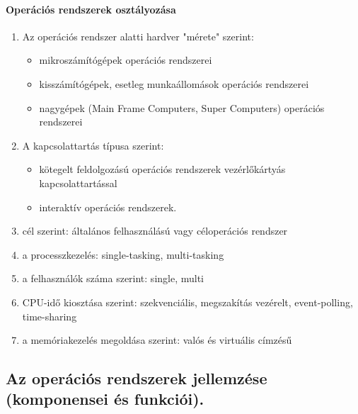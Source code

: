 \paragraph{Operációs rendszerek osztályozása}
	\begin{enumerate}
	\item Az operációs rendszer alatti hardver "mérete" szerint:
		\begin{itemize}
		\item mikroszámítógépek operációs rendszerei
		\item kisszámítógépek, esetleg munkaállomások operációs rendszerei
		\item nagygépek (Main Frame Computers, Super Computers) operációs rendszerei
		\end{itemize}
	\item A kapcsolattartás típusa szerint:
		\begin{itemize}
		\item kötegelt feldolgozású operációs rendszerek vezérlőkártyás kapcsolattartással
		\item interaktív operációs rendszerek.
		\end{itemize}
	\item cél szerint: általános felhasználású vagy céloperációs rendszer
	\item a processzkezelés: single-tasking, multi-tasking
	\item a felhasználók száma szerint: single, multi
	\item CPU-idő kiosztása szerint: szekvenciális, megszakítás vezérelt, event-polling, time-sharing
	\item a memóriakezelés megoldása szerint: valós és virtuális címzésű
	\end{enumerate}

\subsection{Az operációs rendszerek jellemzése (komponensei és funkciói).}
